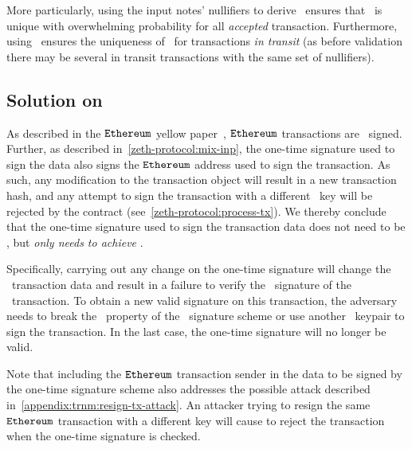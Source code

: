 More particularly, using the input notes' nullifiers to derive \hsig~ensures that \hsig~is unique with overwhelming probability for all \emph{accepted} transaction.
Furthermore, using \randomSeed~ensures the uniqueness of \hsig~for transactions \emph{in transit} (as before validation there may be several in transit transactions with the same set of nullifiers).

\subsection{Solution on \ethereum}\label{appendix:trnm:preliminaries:ethereum-trnm}

As described in the $\texttt{Ethereum}{}$ yellow paper~\cite[Appendix F]{ethyellowpaper}, $\texttt{Ethereum}{}$ transactions are \ecdsa~signed. Further, as described in~\cref{zeth-protocol:mix-inp}, the one-time signature used to sign the \mix{} data also signs the $\texttt{Ethereum}{}$ address used to sign the transaction. As such, any modification to the transaction object will result in a new transaction hash, and any attempt to sign the transaction with a different \ecdsa~key will be rejected by the \mixer{} contract (see~\cref{zeth-protocol:process-tx}). We thereby conclude that the one-time signature used to sign the transaction data does not need to be \sufcma, but \emph{only needs to achieve \ufcma}.

Specifically, carrying out any change on the one-time signature will change the \ethereum~transaction data and result in a failure to verify the \ecdsa~signature of the \ethereum~transaction. To obtain a new valid signature on this transaction, the adversary needs to break the \ufcma~property of the \ecdsa~signature scheme or use another \ecdsa~keypair to sign the transaction. In the last case, the one-time signature will no longer be valid.

Note that including the $\texttt{Ethereum}{}$ transaction sender in the data to be signed by the one-time signature scheme also addresses the possible attack described in~\cref{appendix:trnm:resign-tx-attack}. An attacker trying to resign the same $\texttt{Ethereum}{}$ transaction with a different key will cause \mixer{} to reject the transaction when the one-time signature is checked.

